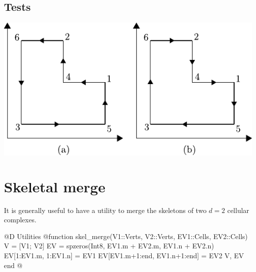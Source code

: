 \subsection{Tests}

\begin{center}
    \includegraphics{./img/ch5-2.pdf}
\end{center}

\section{Skeletal merge}

It is generally useful to have a utility to merge the skeletons of
two $d=2$ cellular complexes.

@D Utilities
@{function skel_merge(V1::Verts, V2::Verts, EV1::Cells, EV2::Cells)
    V = [V1; V2]
    EV = spzeros(Int8, EV1.m + EV2.m, EV1.n + EV2.n)
    EV[1:EV1.m, 1:EV1.n] = EV1
    EV[EV1.m+1:end, EV1.n+1:end] = EV2
    V, EV
end
@}